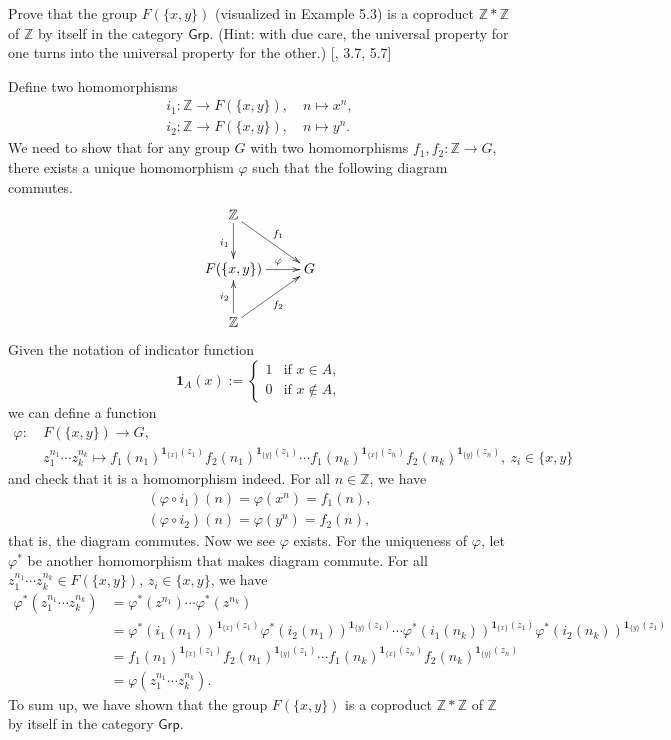 \documentclass[12pt,letterpaper,boxed]{hmcpset}
\newcommand{\Grp}{\mathsf{Grp}}
\begin{document}
\begin{problem}[5.6]
Prove that the group $F(\{x, y\})$ (visualized in Example 5.3) is a coproduct $\mathbb{Z}*\mathbb{Z}$ of $\mathbb{Z}$ by itself in the category $\Grp$. (Hint: with due care, the universal property for one turns into the universal property for the other.) [, 3.7, 5.7]
\end{problem}
\begin{solution}
Define two homomorphisms 
\begin{align*}
i_1:\mathbb{Z}\longrightarrow F(\{x, y\}),\quad n\longmapsto x^n,\\ i_2:\mathbb{Z}\longrightarrow F(\{x, y\}),\quad n\longmapsto y^n.
\end{align*}	
We need to show that for any group $G$ with two homomorphisms $f_1,f_2:\mathbb{Z}\rightarrow G$, there exists a unique homomorphism $\varphi$ such that the following diagram commutes.
\[\xymatrix{
	\mathbb{Z}\ar[rd]^{f_1}\ar[d]_{i_1}  \\
	F(\{x, y\})\ar[r]^{\quad\varphi} &  G\\
	\mathbb{Z}\ar[ru]_{f_2}\ar[u]^{i_2}  
}\]
Given the notation of indicator function
\[\mathbf{1}_A(x) :=
\begin{cases}
	1 &\text{if } x \in A, \\
	0 &\text{if } x \notin A,
\end{cases}
\]
we can define a function
\begin{align*}
\varphi:\ &F(\{x, y\})\longrightarrow G,\\
&z_1^{n_1}\cdots z_k^{n_k} \longmapsto f_1(n_1)^{\mathbf{1}_{\{x\}}(z_1)}f_2(n_1)^{\mathbf{1}_{\{y\}}(z_1)}\cdots f_1(n_k)^{\mathbf{1}_{\{x\}}(z_n)}f_2(n_k)^{\mathbf{1}_{\{y\}}(z_n)},\ z_i\in\{x,y\}
\end{align*}
and check that it is a homomorphism indeed. For all $n\in \mathbb{Z}$, we have
\begin{align*}
(\varphi\circ i_1)(n)=\varphi(x^n)=f_1(n),\\
(\varphi\circ i_2)(n)=\varphi(y^n)=f_2(n),
\end{align*}	
that is, the diagram commutes. Now we see $\varphi$ exists. For the uniqueness of $\varphi$, let $\varphi^*$ be another homomorphism that makes diagram commute. For all $z_1^{n_1}\cdots z_k^{n_k}\in F(\{x, y\}),\,z_i\in\{x, y\}$, we have
\begin{align*}
\varphi^*(z_1^{n_1}\cdots z_k^{n_k})&=\varphi^*(z^{n_1})\cdots \varphi^*(z^{n_k})\\
&=\varphi^*(i_1(n_1))^{\mathbf{1}_{\{x\}}(z_1)}\varphi^*(i_2(n_1))^{\mathbf{1}_{\{y\}}(z_1)}\cdots \varphi^*(i_1(n_k))^{\mathbf{1}_{\{x\}}(z_1)}\varphi^*(i_2(n_k))^{\mathbf{1}_{\{y\}}(z_1)}\\
&=f_1(n_1)^{\mathbf{1}_{\{x\}}(z_1)}f_2(n_1)^{\mathbf{1}_{\{y\}}(z_1)}\cdots f_1(n_k)^{\mathbf{1}_{\{x\}}(z_n)}f_2(n_k)^{\mathbf{1}_{\{y\}}(z_n)}\\
&=\varphi(z_1^{n_1}\cdots z_k^{n_k}).
\end{align*}	
To sum up, we have shown that the group $F(\{x, y\})$ is a coproduct $\mathbb{Z}*\mathbb{Z}$ of $\mathbb{Z}$ by itself in the category $\Grp$.
\end{solution}	
	
\end{document}
